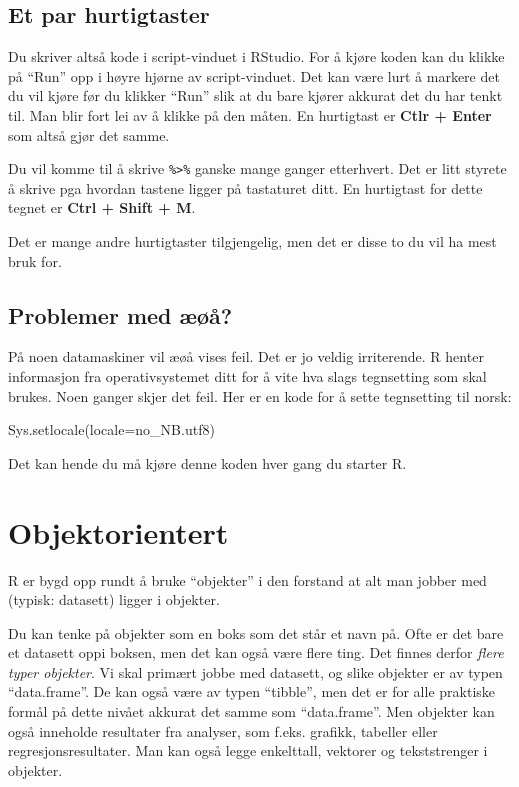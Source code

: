 \documentclass[
  norsk,
  letterpaper,
  DIV=11,
  numbers=noendperiod]{scrreprt}
\newenvironment{Shaded}{\begin{snugshade}}{\end{snugshade}}
\newcommand{\AttributeTok}[1]{\textcolor[rgb]{0.40,0.45,0.13}{#1}}
\newcommand{\FunctionTok}[1]{\textcolor[rgb]{0.28,0.35,0.67}{#1}}
\newcommand{\NormalTok}[1]{\textcolor[rgb]{0.00,0.23,0.31}{#1}}
\newcommand{\StringTok}[1]{\textcolor[rgb]{0.13,0.47,0.30}{#1}}
\theoremstyle{definition}
\theoremstyle{remark}
\begin{document}
\subsection{Et par hurtigtaster}\label{et-par-hurtigtaster}

Du skriver altså kode i script-vinduet i RStudio. For å kjøre koden kan
du klikke på ``Run'' opp i høyre hjørne av script-vinduet. Det kan være
lurt å markere det du vil kjøre før du klikker ``Run'' slik at du bare
kjører akkurat det du har tenkt til. Man blir fort lei av å klikke på
den måten. En hurtigtast er \textbf{Ctlr + Enter} som altså gjør det
samme.

Du vil komme til å skrive \texttt{\%\textgreater{}\%} ganske mange
ganger etterhvert. Det er litt styrete å skrive pga hvordan tastene
ligger på tastaturet ditt. En hurtigtast for dette tegnet er
\textbf{Ctrl + Shift + M}.

Det er mange andre hurtigtaster tilgjengelig, men det er disse to du vil
ha mest bruk for.

\subsection{Problemer med æøå?}\label{problemer-med-uxe6uxf8uxe5}

På noen datamaskiner vil æøå vises feil. Det er jo veldig irriterende. R
henter informasjon fra operativsystemet ditt for å vite hva slags
tegnsetting som skal brukes. Noen ganger skjer det feil. Her er en kode
for å sette tegnsetting til norsk:

\begin{Shaded}
\begin{Highlighting}[]
\FunctionTok{Sys.setlocale}\NormalTok{(}\AttributeTok{locale=}\StringTok{\textquotesingle{}no\_NB.utf8\textquotesingle{}}\NormalTok{)}
\end{Highlighting}
\end{Shaded}

Det kan hende du må kjøre denne koden hver gang du starter R.

\section{Objektorientert}\label{objektorientert}

R er bygd opp rundt å bruke ``objekter'' i den forstand at alt man
jobber med (typisk: datasett) ligger i objekter.

Du kan tenke på objekter som en boks som det står et navn på. Ofte er
det bare et datasett oppi boksen, men det kan også være flere ting. Det
finnes derfor \emph{flere typer objekter}. Vi skal primært jobbe med
datasett, og slike objekter er av typen ``data.frame''. De kan også være
av typen ``tibble'', men det er for alle praktiske formål på dette
nivået akkurat det samme som ``data.frame''. Men objekter kan også
inneholde resultater fra analyser, som f.eks. grafikk, tabeller eller
regresjonsresultater. Man kan også legge enkelttall, vektorer og
tekststrenger i objekter.
\end{document}
